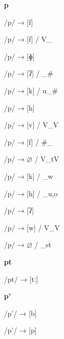 \begin{center}\textbf{p}\end{center}
\begin{multicols}{4}
\noindent /p/ → [f]

\noindent /p/ → [f] / V\_

\noindent /p/ → [ɸ]

\noindent /p/ → [ʔ] / \_\#

\noindent /p/ → [k] / u\_\#

\noindent /p/ → [h]

\noindent /p/ → [v] / V\_V

\noindent /p/ → [f] / \#\_

\noindent /p/ → $\varnothing$ / V\_tV

\noindent /p/ → [k] / \_w

\noindent /p/ → [h] / \_{u,o}

\noindent /p/ → [ʔ]

\noindent /p/ → [w] / V\_V

\noindent /p/ → $\varnothing$ / \_st

\end{multicols}

\begin{center}\textbf{pt}\end{center}
\begin{multicols}{4}
\noindent /pt/ → [tː]

\end{multicols}

\begin{center}\textbf{p'}\end{center}
\begin{multicols}{4}
\noindent /p'/ → [b]

\noindent /p'/ → [p]

\end{multicols}

